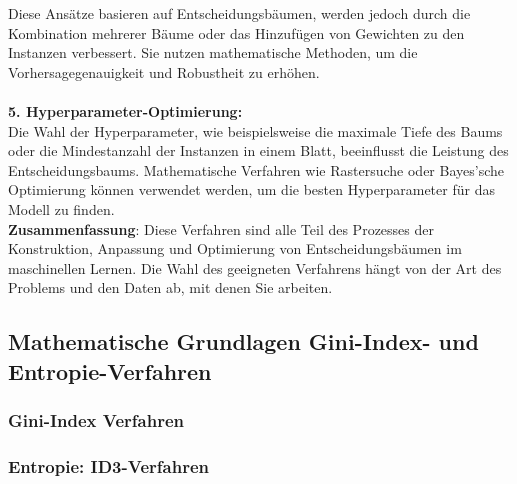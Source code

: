 \documentclass[12pt]{article}
\begin{document}
Diese Ansätze basieren auf Entscheidungsbäumen, werden jedoch durch die Kombination mehrerer Bäume oder das Hinzufügen von Gewichten zu den Instanzen verbessert. Sie nutzen mathematische Methoden, um die Vorhersagegenauigkeit und Robustheit zu erhöhen.\\\\[0.2cm]
%
\textbf{5. Hyperparameter-Optimierung:}\\
Die Wahl der Hyperparameter, wie beispielsweise die maximale Tiefe des Baums oder die Mindestanzahl der Instanzen in einem Blatt, beeinflusst die Leistung des Entscheidungsbaums. Mathematische Verfahren wie Rastersuche oder Bayes'sche Optimierung können verwendet werden, um die besten Hyperparameter für das Modell zu finden.\\[0.2cm]
%
\textbf{Zusammenfassung}:
Diese Verfahren sind alle Teil des Prozesses der Konstruktion, Anpassung und Optimierung von Entscheidungsbäumen im maschinellen Lernen. Die Wahl des geeigneten Verfahrens hängt von der Art des Problems und den Daten ab, mit denen Sie arbeiten.\\[0.4cm]

\subsection{Mathematische Grundlagen Gini-Index- und Entropie-Verfahren }


\subsubsection{Gini-Index Verfahren}

{\color{red}{*******************************************************************\\ 
ab hier bis Ende der section sind die Folien der Vorlesung ML  zu nutzen und diese sind in Latex umzusetzen\\
********************************************************************\\}}



\subsubsection{Entropie: ID3-Verfahren}
\end{document}
